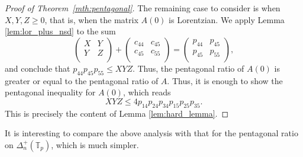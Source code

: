 \documentclass{amsart}
\theoremstyle{definition}
\theoremstyle{remark}
\def\T{\mathbb{T}}
\def\L{\mathbb{L}}
\begin{document}
\begin{proof}[Proof of Theorem~\ref{mth:pentagonal}]
The remaining case to consider is when $X,Y,Z \ge 0$, that is, when the matrix $A(0)$ is Lorentzian. 
We apply Lemma \ref{lem:lor_plus_nsd} to the sum
\[
\begin{pmatrix}
X & Y \\
 Y & Z \\    
\end{pmatrix}+\begin{pmatrix}
c_{44} & c_{45} \\
c_{45} & c_{55} \\    
\end{pmatrix}=\begin{pmatrix}
p_{44} & p_{45} \\
p_{45} & p_{55} \\    
\end{pmatrix},
\]
and conclude that $p_{44}p_{45}p_{55}\leq XYZ$. Thus, the pentagonal ratio of $A(0)$ is greater or equal to the pentagonal ratio of $A$. Thus, it is enough to show the pentagonal inequality for $A(0)$, which reads
\[
XYZ\leq 4p_{14}p_{24}p_{34}p_{15}p_{25}p_{35}.
\]
This is precisely the content of Lemma \ref{lem:hard_lemma}.
\end{proof}

It is interesting to compare the above analysis with that for the pentagonal ratio on $\Delta_n^+(\T_p)$, which is much simpler.
\end{document}
